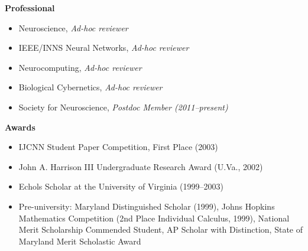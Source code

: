 \documentclass[10pt]{article}
\begin{document}

{\large \textbf{Professional}}\nopagebreak
\begin{itemize}
    \item Neuroscience, \emph{Ad-hoc reviewer}
    \item IEEE/INNS Neural Networks, \emph{Ad-hoc reviewer}
    \item Neurocomputing, \emph{Ad-hoc reviewer}
    \item Biological Cybernetics, \emph{Ad-hoc reviewer}
    \item Society for Neuroscience, \emph{Postdoc Member (2011--present)}
\end{itemize}
    
    
{\large \textbf{Awards}}\nopagebreak

\begin{itemize}
    \item IJCNN Student Paper Competition, First Place (2003)
    \item John A. Harrison III Undergraduate Research Award (U.Va., 2002)                          
    \item Echols Scholar at the University of Virginia (1999--2003)                              
    \item Pre-university: Maryland Distinguished Scholar (1999), Johns Hopkins Mathematics Competition (2nd Place Individual Calculus, 1999), National Merit Scholarship Commended Student, AP Scholar with Distinction, State of Maryland Merit Scholastic Award 
\end{itemize}

% 
\end{document}
